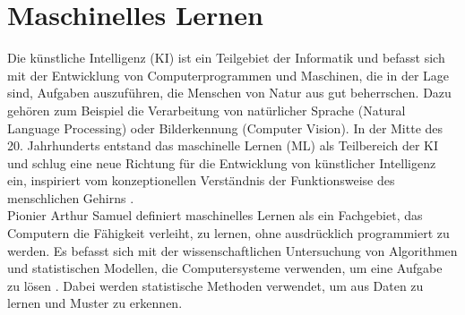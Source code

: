 \documentclass[german,bachelor]{swsLeipzig}
\begin{document}
\section{Maschinelles Lernen}
Die künstliche Intelligenz (KI) ist ein Teilgebiet der Informatik und befasst sich mit der Entwicklung von Computerprogrammen und Maschinen,
die in der Lage sind, Aufgaben auszuführen, die Menschen von Natur aus gut beherrschen.
Dazu gehören zum Beispiel die Verarbeitung von natürlicher Sprache (Natural Language Processing) oder Bilderkennung (Computer Vision).
In der Mitte des 20. Jahrhunderts entstand das maschinelle Lernen (ML) als Teilbereich der KI und schlug eine neue Richtung
für die Entwicklung von künstlicher Intelligenz ein, inspiriert vom konzeptionellen Verständnis der Funktionsweise des menschlichen Gehirns \cite[]{2020}.\\
\indent Pionier Arthur Samuel definiert maschinelles Lernen als ein Fachgebiet, das Computern die Fähigkeit verleiht, zu lernen,
ohne ausdrücklich programmiert zu werden.
Es befasst sich mit der wissenschaftlichen Untersuchung von Algorithmen und statistischen Modellen,
die Computersysteme verwenden, um eine Aufgabe zu lösen \cite[]{mahesh2020machine}.
Dabei werden statistische Methoden verwendet, um aus Daten zu lernen und Muster zu erkennen. \\
\end{document}
